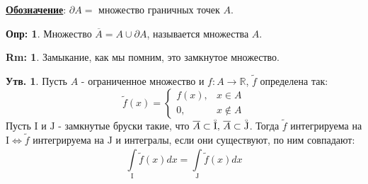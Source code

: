 \documentclass[12pt]{article}
\newcommand{\MR}{\mathbb{R}}
\newcommand{\MI}{\mathrm{I}}
\newcommand{\MJ}{\mathrm{J}}
\theoremstyle{definition}
\newtheorem{defn}{Опр:}
\newtheorem{rem}{Rm:}
\newtheorem{prop}{Утв.}
\newcommand{\ddint}[2]{\displaystyle\int\limits_{#1}^{#2}}
\newcommand{\wte}[1]{\widetilde{#1}}
\newcommand{\ovl}[1]{\overline{#1}}
\newcommand{\Circ}[1]{\accentset{\circ}{#1}}
\begin{document}
\textbf{\uline{Обозначение}}: $\partial A = $ множество граничных точек $A$.
\begin{defn}
	Множество $\overline{A} = A \cup  \partial A$, называется  множества $A$.
\end{defn}
\begin{rem}
	Замыкание, как мы помним, это замкнутое множество.
\end{rem}
\begin{prop}
	Пусть $A$ - ограниченное множество и $f \colon A \to \MR$, $\wte{f}$ определена так:
	$$
		\wte{f}(x) = 
		\begin{cases}
			f(x), & x \in A \\
			0, & x \not\in A
		\end{cases}
	$$
	Пусть $\MI$ и $\MJ$ - замкнутые бруски такие, что $\ovl{A} \subset \Circ{\MI}, \, \ovl{A} \subset \Circ{\MJ}$. Тогда $\wte{f}$ интегрируема на $\MI \Leftrightarrow \wte{f}$ интегрируема на $\MJ$ и интегралы, если они существуют, по ним совпадают:
	$$
		\ddint{\MI}{}\wte{f}(x)dx = \ddint{\MJ}{}\wte{f}(x)dx
	$$
\end{prop}
\end{document}
